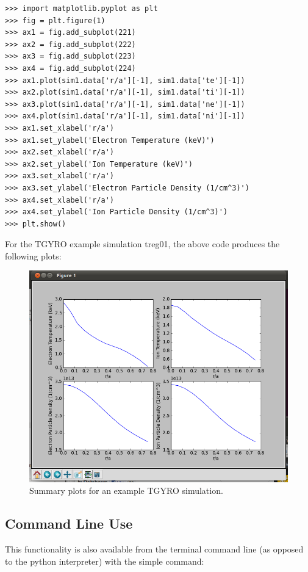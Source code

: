 \documentclass{article}
\begin{document}
\addtolength{\parskip}{-\baselineskip}

\begin{verbatim}
>>> import matplotlib.pyplot as plt
>>> fig = plt.figure(1)
>>> ax1 = fig.add_subplot(221)
>>> ax2 = fig.add_subplot(222)
>>> ax3 = fig.add_subplot(223)
>>> ax4 = fig.add_subplot(224)
>>> ax1.plot(sim1.data['r/a'][-1], sim1.data['te'][-1])
>>> ax2.plot(sim1.data['r/a'][-1], sim1.data['ti'][-1])
>>> ax3.plot(sim1.data['r/a'][-1], sim1.data['ne'][-1])
>>> ax4.plot(sim1.data['r/a'][-1], sim1.data['ni'][-1])
>>> ax1.set_xlabel('r/a')
>>> ax1.set_ylabel('Electron Temperature (keV)')
>>> ax2.set_xlabel('r/a')
>>> ax2.set_ylabel('Ion Temperature (keV)')
>>> ax3.set_xlabel('r/a')
>>> ax3.set_ylabel('Electron Particle Density (1/cm^3)')
>>> ax4.set_xlabel('r/a')
>>> ax4.set_ylabel('Ion Particle Density (1/cm^3)')
>>> plt.show()
\end{verbatim}

\addtolength{\parskip}{\baselineskip}
\fontfamily{\rmdefault}\selectfont

\noindent For the TGYRO example simulation treg01, the above code produces the following plots:

\begin{figure}[H]
  \centering
    \includegraphics[scale=.5]{pssht1.png}
  \caption{Summary plots for an example TGYRO simulation.}
\end{figure}

\subsection{Command Line Use}
\noindent This functionality is also available from the terminal command line (as opposed to the python interpreter) with the simple command:
\end{document}
